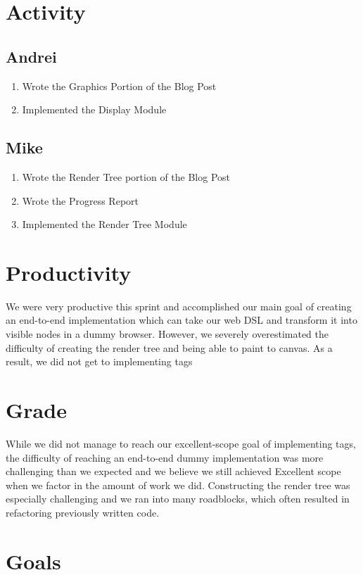 \documentclass{article}
\begin{document}
\section*{Activity}

\subsection*{Andrei}
\begin{enumerate}
	\item Wrote the Graphics Portion of the Blog Post
	\item Implemented the Display Module
\end{enumerate}

\subsection*{Mike}
\begin{enumerate}
	\item Wrote the Render Tree portion of the Blog Post
	\item Wrote the Progress Report
	\item Implemented the Render Tree Module
\end{enumerate}

\section*{Productivity}
We were very productive this sprint and accomplished our main goal
of creating an end-to-end implementation which can take our web DSL and
transform it into visible nodes in a dummy browser. However, we severely
overestimated the difficulty of creating the render tree and
being able to paint to canvas. As a result, we did not get to implementing
tags

\section*{Grade}

While we did not manage to reach our excellent-scope goal
of implementing tags, the difficulty of reaching an end-to-end dummy
implementation was more challenging than we expected and we believe we
still achieved Excellent scope when we factor in the amount of work
we did. Constructing the render tree was especially challenging
and we ran into many roadblocks, which often resulted in refactoring
previously written code.

\section*{Goals}
\end{document}
